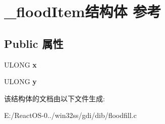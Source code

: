 \hypertarget{struct__flood_item}{}\section{\+\_\+flood\+Item结构体 参考}
\label{struct__flood_item}
\subsection*{Public 属性}
\begin{DoxyCompactItemize}
\item 
\mbox{\label{struct__flood_item_ae5769604ae7335f274c82b8fbeb9d523}} 
U\+L\+O\+NG {\bfseries x}
\item 
\mbox{\label{struct__flood_item_aed0fd8830a0fab2a22cfce8b2540ac69}} 
U\+L\+O\+NG {\bfseries y}
\end{DoxyCompactItemize}


该结构体的文档由以下文件生成\+:\begin{DoxyCompactItemize}
\item 
E\+:/\+React\+O\+S-\/0../win32ss/gdi/dib/floodfill.\+c\end{DoxyCompactItemize}
